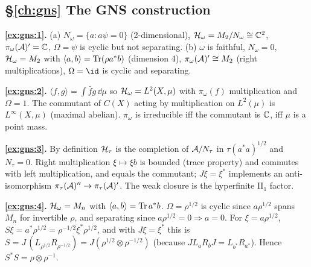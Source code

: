 {\subsection*{\S\ref{ch:gns} The GNS construction}
\textbf{\ref{ex:gns:1}.} (a) $N_\omega=\{a:a\psi=0\}$ (2-dimensional), $\mathcal{H}_\omega=M_2/N_\omega\cong\mathbb{C}^2$, $\pi_\omega(\mathcal{A})'=\mathbb{C}$, $\Omega=\psi$ is cyclic but not separating. (b) $\omega$ is faithful, $N_\omega=0$, $\mathcal{H}_\omega=M_2$ with $\langle a,b\rangle=\operatorname{Tr}(\rho a^*b)$ (dimension 4), $\pi_\omega(\mathcal{A})'\cong M_2$ (right multiplications), $\Omega=\id$ is cyclic and separating.\par
\textbf{\ref{ex:gns:2}.} $\langle f,g\rangle=\int\bar fg\,\dd\mu$ so $\mathcal{H}_\omega=L^2(X,\mu)$ with $\pi_\omega(f)$ multiplication and $\Omega=1$. The commutant of $C(X)$ acting by multiplication on $L^2(\mu)$ is $L^\infty(X,\mu)$ (maximal abelian). $\pi_\omega$ is irreducible iff the commutant is $\mathbb{C}$, iff $\mu$ is a point mass.\par
\textbf{\ref{ex:gns:3}.} By definition $\mathcal{H}_\tau$ is the completion of $\mathcal{A}/N_\tau$ in $\tau(a^*a)^{1/2}$ and $N_\tau=0$. Right multiplication $\xi\mapsto\xi b$ is bounded (trace property) and commutes with left multiplication, and equals the commutant; $J\xi=\xi^*$ implements an anti-isomorphism $\pi_\tau(\mathcal{A})''\to\pi_\tau(\mathcal{A})'$. The weak closure is the hyperfinite II$_1$ factor.\par
\textbf{\ref{ex:gns:4}.} $\mathcal{H}_\omega=M_n$ with $\langle a,b\rangle=\operatorname{Tr} a^*b$. $\Omega=\rho^{1/2}$ is cyclic since $a\rho^{1/2}$ spans $M_n$ for invertible $\rho$, and separating since $a\rho^{1/2}=0\Rightarrow a=0$. For $\xi=a\rho^{1/2}$, $S\xi=a^*\rho^{1/2}=\rho^{-1/2}\xi^*\rho^{1/2}$, and with $J\xi=\xi^*$ this is $S=J\,(L_{\rho^{1/2}}R_{\rho^{-1/2}})=J(\rho^{1/2}\otimes\rho^{-1/2})$ (because $JL_aR_bJ=L_{b^*}R_{a^*}$). Hence $S^*S=\rho\otimes\rho^{-1}$.\par

}
